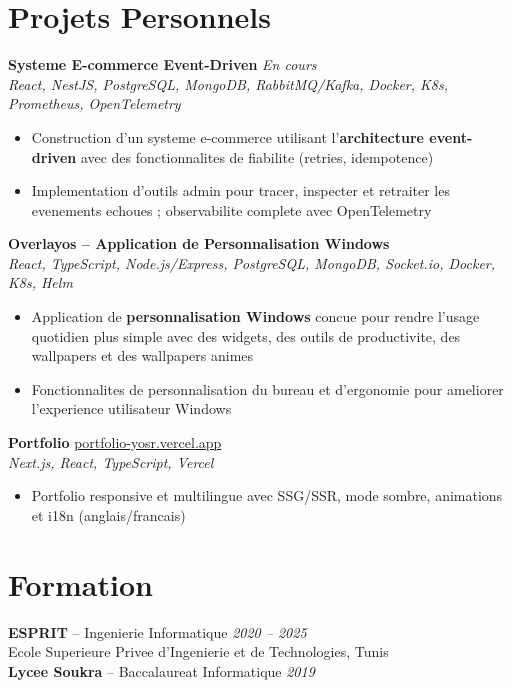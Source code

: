 \documentclass[10pt,a4paper]{article}
\begin{document}
\section*{Projets Personnels}
{\small

\textbf{Systeme E-commerce Event-Driven} \hfill \textit{En cours}\\[1pt]
\textit{React, NestJS, PostgreSQL, MongoDB, RabbitMQ/Kafka, Docker, K8s, Prometheus, OpenTelemetry}
\begin{itemize}
  \item Construction d'un systeme e-commerce utilisant l'\textbf{architecture event-driven} avec des fonctionnalites de fiabilite (retries, idempotence)
  \item Implementation d'outils admin pour tracer, inspecter et retraiter les evenements echoues ; observabilite complete avec OpenTelemetry
\end{itemize}

\vspace{3pt}
\textbf{Overlayos -- Application de Personnalisation Windows} \\[1pt]
\textit{React, TypeScript, Node.js/Express, PostgreSQL, MongoDB, Socket.io, Docker, K8s, Helm}
\begin{itemize}
  \item Application de \textbf{personnalisation Windows} concue pour rendre l'usage quotidien plus simple avec des widgets, des outils de productivite, des wallpapers et des wallpapers animes
  \item Fonctionnalites de personnalisation du bureau et d'ergonomie pour ameliorer l'experience utilisateur Windows
\end{itemize}

\vspace{3pt}
\textbf{Portfolio} \hfill \href{https://portfolio-yosr.vercel.app/en}{portfolio-yosr.vercel.app}\\[1pt]
\textit{Next.js, React, TypeScript, Vercel}
\begin{itemize}
  \item Portfolio responsive et multilingue avec SSG/SSR, mode sombre, animations et i18n (anglais/francais)
\end{itemize}

}

\section*{Formation}
{\small
\textbf{ESPRIT} -- Ingenierie Informatique \hfill \textit{2020 -- 2025}\\[1pt]
Ecole Superieure Privee d'Ingenierie et de Technologies, Tunis\\[3pt]
\textbf{Lycee Soukra} -- Baccalaureat Informatique \hfill \textit{2019}
}
\end{document}
